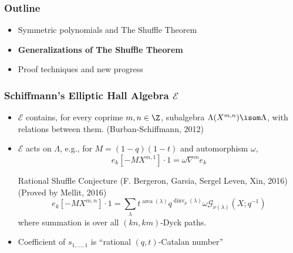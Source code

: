 \documentclass{beamer}
\newcommand{\sym}{\Lambda}
\DeclareMathOperator{\area}{area}
\DeclareMathOperator{\dinv}{dinv}
\newcommand{\Gcal}{\mathcal{G}}
\newcommand{\Ecal}{{\mathcal E}}
\newcounter{c}
\begin{document}
\begin{frame}
  \frametitle{Outline}
  \begin{itemize}
  \item Symmetric polynomials and The Shuffle Theorem
  \item {\bf Generalizations of The Shuffle Theorem}
  \item Proof techniques and new progress
  \end{itemize}
\end{frame}
\begin{frame}
  \frametitle{Schiffmann's Elliptic Hall Algebra \(\Ecal\)}
  \begin{itemize}
  \item \(\Ecal\) contains, for every coprime \(m,n \in \Z\), subalgebra \(\sym(X^{m,n})
    \isom \sym\), with relations between them. (Burban-Schiffmann, 2012)\pause
  \item \(\Ecal\) acts on \(\sym\), e.g., for \(M = (1-q)(1-t)\) and
    automorphism \(\omega\), \[
      e_k[-MX^{m,1}] \cdot 1 = \omega \nabla^m e_k
    \]\pause
  \begin{block}{Rational Shuffle Conjecture (F. Bergeron, Garsia,
      Sergel Leven, Xin, 2016) (Proved by Mellit, 2016)}
    \[e_k[-MX^{m,n}] \cdot 1 = \sum_\lambda t^{\area(\lambda)}
    q^{\dinv_p(\lambda)} \omega \Gcal_{\nu(\lambda)}(X;q^{-1})\]
  where summation is over all \((kn,km)\)-Dyck paths.
  \end{block}\pause
  \item Coefficient of \(s_{1,\ldots,1}\) is ``rational \((q,t)\)-Catalan number''
  \end{itemize}
\end{frame}
\end{document}
